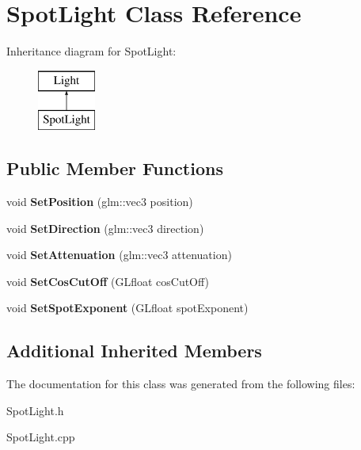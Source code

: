 \hypertarget{class_spot_light}{}\section{Spot\+Light Class Reference}
\label{class_spot_light}
Inheritance diagram for Spot\+Light\+:\begin{figure}[H]
\begin{center}
\leavevmode
\includegraphics[height=2.000000cm]{class_spot_light}
\end{center}
\end{figure}
\subsection*{Public Member Functions}
\begin{DoxyCompactItemize}
\item 
\hypertarget{class_spot_light_a66a62acf516440ac717b4aa464c3c94a}{}void {\bfseries Set\+Position} (glm\+::vec3 position)\label{class_spot_light_a66a62acf516440ac717b4aa464c3c94a}

\item 
\hypertarget{class_spot_light_ac8239339ffa7dd31ea07a4cdcc36c4f4}{}void {\bfseries Set\+Direction} (glm\+::vec3 direction)\label{class_spot_light_ac8239339ffa7dd31ea07a4cdcc36c4f4}

\item 
\hypertarget{class_spot_light_addcb3fc1007d25b33f4275ff16f26073}{}void {\bfseries Set\+Attenuation} (glm\+::vec3 attenuation)\label{class_spot_light_addcb3fc1007d25b33f4275ff16f26073}

\item 
\hypertarget{class_spot_light_ac7a4c2343ed2d8da4f2511d50318cb5f}{}void {\bfseries Set\+Cos\+Cut\+Off} (G\+Lfloat cos\+Cut\+Off)\label{class_spot_light_ac7a4c2343ed2d8da4f2511d50318cb5f}

\item 
\hypertarget{class_spot_light_aa45ba8d849a2a9a994f144c2610fa498}{}void {\bfseries Set\+Spot\+Exponent} (G\+Lfloat spot\+Exponent)\label{class_spot_light_aa45ba8d849a2a9a994f144c2610fa498}

\end{DoxyCompactItemize}
\subsection*{Additional Inherited Members}


The documentation for this class was generated from the following files\+:\begin{DoxyCompactItemize}
\item 
Spot\+Light.\+h\item 
Spot\+Light.\+cpp\end{DoxyCompactItemize}
